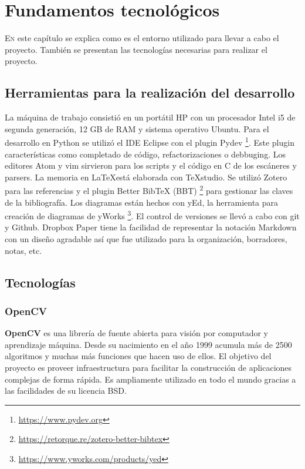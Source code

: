 
\chapter{Fundamentos tecnológicos}
\label{chap:fundamentos-tecnologicos}

\lettrine{E}{n} este capítulo se explica como es el entorno utilizado para llevar a cabo el proyecto. También se presentan las tecnologías necesarias para realizar el proyecto.

\section{Herramientas para la realización del desarrollo}

La máquina de trabajo consistió en un portátil HP con un procesador Intel i5 de segunda generación, 12 GB de RAM y sistema operativo Ubuntu. Para el desarrollo en Python se utilizó el IDE Eclipse con el plugin Pydev
\footnote{\url{https://www.pydev.org}}. Este plugin características como completado de código, refactorizaciones o debbuging. Los editores Atom y vim sirvieron para los scripts y el código en C de los escáneres y parsers. La memoria en \LaTeX está elaborada con TeXstudio. Se utilizó Zotero para las referencias y el plugin Better BibTeX (BBT) 
\footnote{\url{https://retorque.re/zotero-better-bibtex}} para gestionar las claves de la bibliografía. Los diagramas están hechos con yEd, la herramienta para creación de diagramas de yWorks 
\footnote{\url{https://www.yworks.com/products/yed}}. El control de versiones se llevó a cabo con git y Github. Dropbox Paper tiene la facilidad de representar la notación Markdown con un diseño agradable así que fue utilizado para la organización, borradores, notas, etc.

\section{Tecnologías}

\subsection{OpenCV}

\textbf{OpenCV} \cite{opencvTeam_oficialSite_main} es una librería de fuente abierta para visión por computador y aprendizaje máquina. Desde su nacimiento en el año 1999 acumula más de 2500 algoritmos y muchas más funciones que hacen uso de ellos. El objetivo del proyecto es proveer infraestructura para facilitar la construcción de aplicaciones complejas de forma rápida. Es ampliamente utilizado en todo el mundo gracias a las facilidades de su licencia BSD. 

